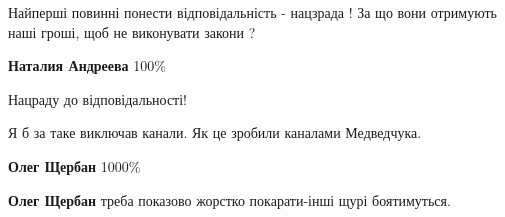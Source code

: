 \begin{itemize}
 

Найперші повинні понести відповідальність - нацзрада ! За що вони отримують
наші гроші, щоб не виконувати закони ?

\begin{itemize}

 
\textbf{Наталия Андреева} 100\%

 
Нацраду до відповідальності!
\end{itemize}

 
Я б за таке виключав канали. Як це зробили каналами Медведчука.

\begin{itemize}

 
\textbf{Олег Щербан} 1000\%

 
\textbf{Олег Щербан} треба показово жорстко покарати-інші щурі боятимуться.

 

\end{itemize}
\end{itemize}
